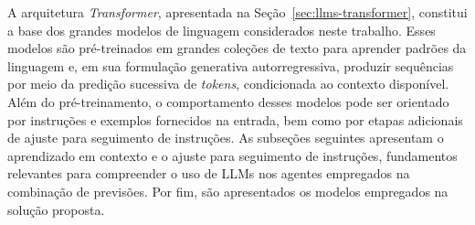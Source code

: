 
A arquitetura \textit{Transformer}, apresentada na Seção~\ref{sec:llms-transformer}, constitui a base dos grandes modelos de linguagem considerados neste trabalho. Esses modelos são pré-treinados em grandes coleções de texto para aprender padrões da linguagem e, em sua formulação generativa autorregressiva, produzir sequências por meio da predição sucessiva de \textit{tokens}, condicionada ao contexto disponível. Além do pré-treinamento, o comportamento desses modelos pode ser orientado por instruções e exemplos fornecidos na entrada, bem como por etapas adicionais de ajuste para seguimento de instruções. As subseções seguintes apresentam o aprendizado em contexto e o ajuste para seguimento de instruções, fundamentos relevantes para compreender o uso de LLMs nos agentes empregados na combinação de previsões. Por fim, são apresentados os modelos empregados na solução proposta.






